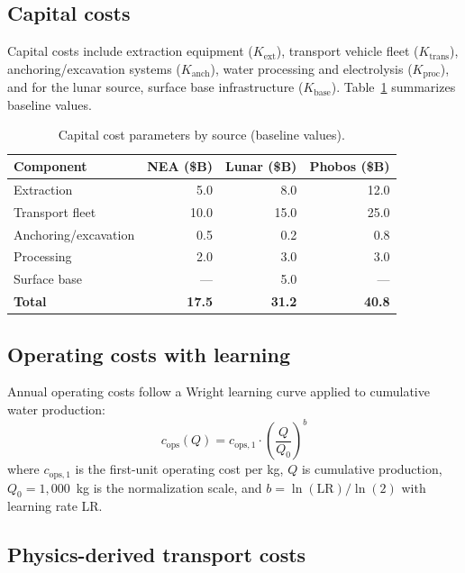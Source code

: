 \documentclass[preprint,12pt]{elsarticle}
\begin{document}
\subsection{Capital costs}

Capital costs include extraction equipment ($K_\text{ext}$), transport vehicle fleet ($K_\text{trans}$), anchoring/excavation systems ($K_\text{anch}$), water processing and electrolysis ($K_\text{proc}$), and for the lunar source, surface base infrastructure ($K_\text{base}$). Table~\ref{tab:capital} summarizes baseline values.

\begin{table}[ht]
\centering
\caption{Capital cost parameters by source (baseline values).}
\label{tab:capital}
\begin{tabular}{lrrr}
\toprule
\textbf{Component} & \textbf{NEA (\$B)} & \textbf{Lunar (\$B)} & \textbf{Phobos (\$B)} \\
\midrule
Extraction & 5.0 & 8.0 & 12.0 \\
Transport fleet & 10.0 & 15.0 & 25.0 \\
Anchoring/excavation & 0.5 & 0.2 & 0.8 \\
Processing & 2.0 & 3.0 & 3.0 \\
Surface base & --- & 5.0 & --- \\
\midrule
\textbf{Total} & \textbf{17.5} & \textbf{31.2} & \textbf{40.8} \\
\bottomrule
\end{tabular}
\end{table}

\subsection{Operating costs with learning}

Annual operating costs follow a Wright learning curve applied to cumulative water production:
\begin{equation}
    c_\text{ops}(Q) = c_{\text{ops},1} \cdot \left(\frac{Q}{Q_0}\right)^b
    \label{eq:learning}
\end{equation}
where $c_{\text{ops},1}$ is the first-unit operating cost per kg, $Q$ is cumulative production, $Q_0 = 1{,}000$~kg is the normalization scale, and $b = \ln(\text{LR}) / \ln(2)$ with learning rate LR.

\subsection{Physics-derived transport costs}
\label{sec:transport}
\end{document}
